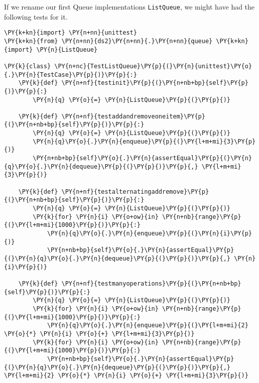If we rename our first Queue implementations \texttt{ListQueue}, we might have had the following tests for it.

\begin{Verbatim}[commandchars=\\\{\}]
\PY{k+kn}{import} \PY{n+nn}{unittest}
\PY{k+kn}{from} \PY{n+nn}{ds2}\PY{n+nn}{.}\PY{n+nn}{queue} \PY{k+kn}{import} \PY{n}{ListQueue}

\PY{k}{class} \PY{n+nc}{TestListQueue}\PY{p}{(}\PY{n}{unittest}\PY{o}{.}\PY{n}{TestCase}\PY{p}{)}\PY{p}{:}
    \PY{k}{def} \PY{n+nf}{testinit}\PY{p}{(}\PY{n+nb+bp}{self}\PY{p}{)}\PY{p}{:}
        \PY{n}{q} \PY{o}{=} \PY{n}{ListQueue}\PY{p}{(}\PY{p}{)}

    \PY{k}{def} \PY{n+nf}{testaddandremoveoneitem}\PY{p}{(}\PY{n+nb+bp}{self}\PY{p}{)}\PY{p}{:}
        \PY{n}{q} \PY{o}{=} \PY{n}{ListQueue}\PY{p}{(}\PY{p}{)}
        \PY{n}{q}\PY{o}{.}\PY{n}{enqueue}\PY{p}{(}\PY{l+m+mi}{3}\PY{p}{)}
        \PY{n+nb+bp}{self}\PY{o}{.}\PY{n}{assertEqual}\PY{p}{(}\PY{n}{q}\PY{o}{.}\PY{n}{dequeue}\PY{p}{(}\PY{p}{)}\PY{p}{,} \PY{l+m+mi}{3}\PY{p}{)}

    \PY{k}{def} \PY{n+nf}{testalternatingaddremove}\PY{p}{(}\PY{n+nb+bp}{self}\PY{p}{)}\PY{p}{:}
        \PY{n}{q} \PY{o}{=} \PY{n}{ListQueue}\PY{p}{(}\PY{p}{)}
        \PY{k}{for} \PY{n}{i} \PY{o+ow}{in} \PY{n+nb}{range}\PY{p}{(}\PY{l+m+mi}{1000}\PY{p}{)}\PY{p}{:}
            \PY{n}{q}\PY{o}{.}\PY{n}{enqueue}\PY{p}{(}\PY{n}{i}\PY{p}{)}
            \PY{n+nb+bp}{self}\PY{o}{.}\PY{n}{assertEqual}\PY{p}{(}\PY{n}{q}\PY{o}{.}\PY{n}{dequeue}\PY{p}{(}\PY{p}{)}\PY{p}{,} \PY{n}{i}\PY{p}{)}

    \PY{k}{def} \PY{n+nf}{testmanyoperations}\PY{p}{(}\PY{n+nb+bp}{self}\PY{p}{)}\PY{p}{:}
        \PY{n}{q} \PY{o}{=} \PY{n}{ListQueue}\PY{p}{(}\PY{p}{)}
        \PY{k}{for} \PY{n}{i} \PY{o+ow}{in} \PY{n+nb}{range}\PY{p}{(}\PY{l+m+mi}{1000}\PY{p}{)}\PY{p}{:}
            \PY{n}{q}\PY{o}{.}\PY{n}{enqueue}\PY{p}{(}\PY{l+m+mi}{2} \PY{o}{*} \PY{n}{i} \PY{o}{+} \PY{l+m+mi}{3}\PY{p}{)}
        \PY{k}{for} \PY{n}{i} \PY{o+ow}{in} \PY{n+nb}{range}\PY{p}{(}\PY{l+m+mi}{1000}\PY{p}{)}\PY{p}{:}
            \PY{n+nb+bp}{self}\PY{o}{.}\PY{n}{assertEqual}\PY{p}{(}\PY{n}{q}\PY{o}{.}\PY{n}{dequeue}\PY{p}{(}\PY{p}{)}\PY{p}{,} \PY{l+m+mi}{2} \PY{o}{*} \PY{n}{i} \PY{o}{+} \PY{l+m+mi}{3}\PY{p}{)}


\end{Verbatim}
